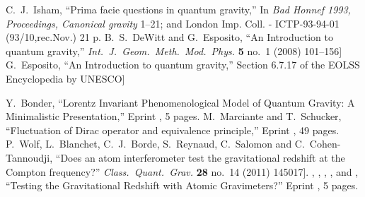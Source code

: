 \begin{thebibliography}{99}
  C.~J.~Isham,\newblock
  ``Prima facie questions in quantum gravity,''\newblock
  In \emph{Bad Honnef 1993, Proceedings, Canonical gravity} 1--21; and London Imp. Coll. - ICTP-93-94-01 (93/10,rec.Nov.) 21 p\newblock
  [\arXiv{gr-qc/9310031}].
  B.~S.~DeWitt and G.~Esposito,\newblock
  ``An Introduction to quantum gravity,''\newblock
  \emph{Int.\ J.\ Geom.\ Meth.\ Mod.\ Phys.} {\bf 5} no.~1 (2008) 101--156\newblock
  [\arXiv[hep-th]{0711.2445}]
  G.~Esposito,\newblock
  ``An Introduction to quantum gravity,''\newblock
  Section 6.7.17 of the EOLSS Encyclopedia by UNESCO\newblock
  [\arXiv[hep-th]{1108.3269}]

  Y.~Bonder,\newblock
  ``Lorentz Invariant Phenomenological Model of Quantum Gravity: A Minimalistic Presentation,''\newblock
  Eprint , 5 pages.
  M.~Marciante and T.~Schucker,\newblock
  ``Fluctuation of Dirac operator and equivalence principle,''\newblock
  Eprint , 49 pages.
  P.~Wolf, L.~Blanchet, C.~J.~Borde, S.~Reynaud, C.~Salomon and C.~Cohen-Tannoudji,\newblock
  ``Does an atom interferometer test the gravitational redshift at the Compton frequency?''\newblock
  \emph{Class.\ Quant.\ Grav.} {\bf 28} no.~14 (2011) 145017\newblock
  [\arXiv[gr-qc]{1012.1194}].
  \bysame, \bysame, \bysame, \bysame, \bysame{} and \bysame,\newblock
  ``Testing the Gravitational Redshift with Atomic Gravimeters?''\newblock
  Eprint , 5 pages.


\end{thebibliography}
